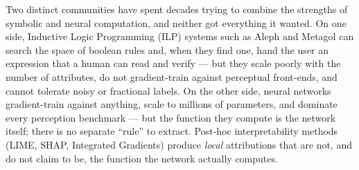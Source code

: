 \documentclass{article}
\begin{document}
Two distinct communities have spent decades trying to combine the strengths of symbolic and neural computation, and neither got everything it wanted.
On one side, Inductive Logic Programming (ILP) systems such as Aleph and Metagol can search the space of boolean rules and, when they find one, hand the user an expression that a human can read and verify --- but they scale poorly with the number of attributes, do not gradient-train against perceptual front-ends, and cannot tolerate noisy or fractional labels.
On the other side, neural networks gradient-train against anything, scale to millions of parameters, and dominate every perception benchmark --- but the function they compute is the network itself; there is no separate ``rule'' to extract.
Post-hoc interpretability methods (LIME, SHAP, Integrated Gradients) produce \emph{local} attributions that are not, and do not claim to be, the function the network actually computes.
\end{document}
